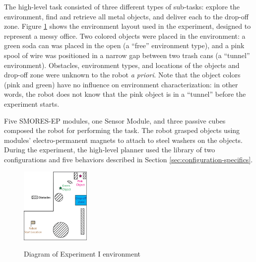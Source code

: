 \documentclass[conference]{IEEEtran}
\begin{document}
The high-level task consisted of three different types of sub-tasks: explore the environment, find and retrieve all metal objects, and deliver each to the drop-off zone. Figure \ref{fig:map} shows the environment layout used in the experiment, designed to represent a messy office. Two colored objects were placed in the environment: a green soda can was placed in the open (a ``free'' environment type), and a pink spool of wire was positioned in a narrow gap between two trash cans (a ``tunnel'' environment). Obstacles, environment types, and locations of the objects and drop-off zone were unknown to the robot \textit{a priori}.  Note that the object colors (pink and green) have no influence on environment characterization: in other words, the robot does not know that the pink object is in a ``tunnel''  before the experiment starts.

Five SMORES-EP modules, one Sensor Module, and three passive cubes composed the robot for performing the task. The robot grasped objects using modules' electro-permanent magnets to attach to steel washers on the objects.
During the experiment, the high-level planner used the library of two configurations and five behaviors described in Section \ref{sec:configuration-specifics}.

\begin{figure}
\begin{center}
\includegraphics[width=0.3\textwidth]{images/RSSMap.png}
\caption{Diagram of Experiment I environment}
\vspace{-2em}
\label{fig:map}
\end{center}
\end{figure}
\end{document}
